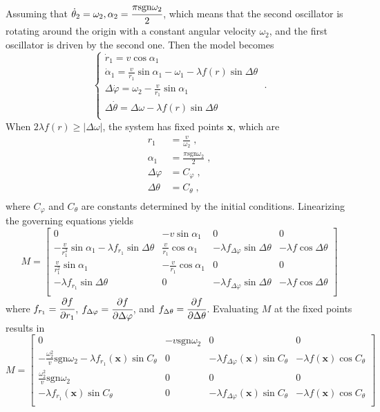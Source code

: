 \documentclass{article}
\begin{document}
Assuming that $\dot{\theta}_2=\omega _2, \alpha_2=\cfrac{\pi\text{sgn}\omega_2}{2}$, which means that the second oscillator is rotating around the origin with a constant angular velocity $\omega_2$, and the first oscillator is driven by the second one. Then the model becomes
$$
\begin{cases}
    \dot{r}_1=v\cos \alpha _1\\
    \dot{\alpha}_1=\frac{v}{r_1}\sin \alpha _1-\omega _1-\lambda f\left( r \right) \sin \Delta \theta\\
    \Delta \dot{\varphi}=\omega _2-\frac{v}{r_1}\sin \alpha _1\\
    \Delta \dot{\theta}=\Delta \omega -\lambda f\left( r \right) \sin \Delta \theta\\
\end{cases}\;.
$$
When $2\lambda f\left( r \right) \geqslant \left| \Delta \omega \right|$, the system has fixed points $\mathbf{x}$, which are
$$
\begin{aligned}
	r_1&=\frac{v}{\omega _2}\;,\\
	\alpha _1&=\frac{\pi \text{sgn} \omega _2}{2}\;,\\
	\Delta \varphi &=C_{\varphi}\;,\\
	\Delta \theta &=C_{\theta}\;,\\
\end{aligned}
$$
where $C_{\varphi}$ and $C_{\theta}$ are constants determined by the initial conditions. Linearizing the governing equations yields
$$
M=\left[ \begin{matrix}
	0&		-v\sin \alpha _1&		0&		0\\
	-\frac{v}{r_{1}^{2}}\sin \alpha _1-\lambda f_{r_1}\sin \Delta \theta&		\frac{v}{r_1}\cos \alpha _1&		-\lambda f_{\Delta \varphi}\sin \Delta \theta&		-\lambda f\cos \Delta \theta\\
	\frac{v}{r_{1}^{2}}\sin \alpha _1&		-\frac{v}{r_1}\cos \alpha _1&		0&		0\\
	-\lambda f_{r_1}\sin \Delta \theta&		0&		-\lambda f_{\Delta \varphi}\sin \Delta \theta&		-\lambda f\cos \Delta \theta\\
\end{matrix} \right] 
$$
where $f_{r_1}=\cfrac{\partial f}{\partial r_1}$, $f_{\Delta \varphi}=\cfrac{\partial f}{\partial \Delta \varphi}$, and $f_{\Delta \theta}=\cfrac{\partial f}{\partial \Delta \theta}$. Evaluating $M$ at the fixed points results in
$$
M=\left[ \begin{matrix}
	0&		-v\text{sgn} \omega _2&		0&		0\\
	-\frac{\omega _{2}^{2}}{v}\text{sgn} \omega _2-\lambda f_{r_1}\left( \mathbf{x} \right) \sin C_{\theta}&		0&		-\lambda f_{\Delta \varphi}\left( \mathbf{x} \right) \sin C_{\theta}&		-\lambda f\left( \mathbf{x} \right) \cos C_{\theta}\\
	\frac{\omega _{2}^{2}}{v}\text{sgn} \omega _2&		0&		0&		0\\
	-\lambda f_{r_1}\left( \mathbf{x} \right) \sin C_{\theta}&		0&		-\lambda f_{\Delta \varphi}\left( \mathbf{x} \right) \sin C_{\theta}&		-\lambda f\left( \mathbf{x} \right) \cos C_{\theta}\\
\end{matrix} \right] 
$$
\end{document}
